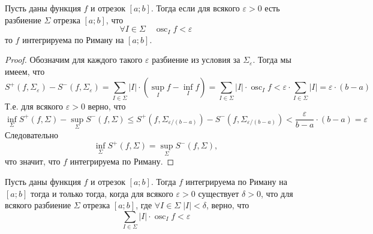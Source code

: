 \documentclass[12pt,a4paper]{article}
\DeclareMathOperator*{\osc}{osc}
\begin{document}
    \begin{lemma}
        Пусть даны функция $f$ и отрезок $[a; b]$. Тогда если для всякого $\varepsilon > 0$ есть разбиение $\Sigma$ отрезка $[a; b]$, что
        \[\forall I \in \Sigma\quad \osc_I f < \varepsilon\]
        то $f$ интегрируема по Риману на $[a; b]$.
    \end{lemma}

    \begin{proof}
        Обозначим для каждого такого $\varepsilon$ разбиение из условия за $\Sigma_\varepsilon$. Тогда мы имеем, что
        \[
            S^+(f, \Sigma_\varepsilon) - S^-(f, \Sigma_\varepsilon)
            = \sum_{I \in \Sigma} |I| \cdot (\sup_I f - \inf_I f)
            = \sum_{I \in \Sigma} |I| \cdot \osc_I f
            < \varepsilon \cdot \sum_{I \in \Sigma} |I|
            = \varepsilon \cdot (b - a)
        \]
        Т.е. для всякого $\varepsilon > 0$ верно, что
        \[
            \inf_{\Sigma} S^+(f, \Sigma) - \sup_{\Sigma} S^-(f, \Sigma)
            \leqslant S^+(f, \Sigma_{\varepsilon / (b - a)}) - S^-(f, \Sigma_{\varepsilon / (b - a)})
            < \frac{\varepsilon}{b - a} \cdot (b - a)
            = \varepsilon
        \]
        Следовательно
        \[\inf_{\Sigma} S^+(f, \Sigma) = \sup_{\Sigma} S^-(f, \Sigma),\]
        что значит, что $f$ интегрируема по Риману.
    \end{proof}

    \begin{lemma}
        Пусть даны функция $f$ и отрезок $[a; b]$. Тогда $f$ интегрируема по Риману на $[a; b]$ тогда и только тогда, когда для всякого $\varepsilon > 0$ существует $\delta > 0$, что для всякого разбиение $\Sigma$ отрезка $[a; b]$, где $\forall I \in \Sigma\; |I| < \delta$, верно, что
        \[\sum_{I \in \Sigma} |I| \cdot \osc_I f < \varepsilon\]
    \end{lemma}
\end{document}
